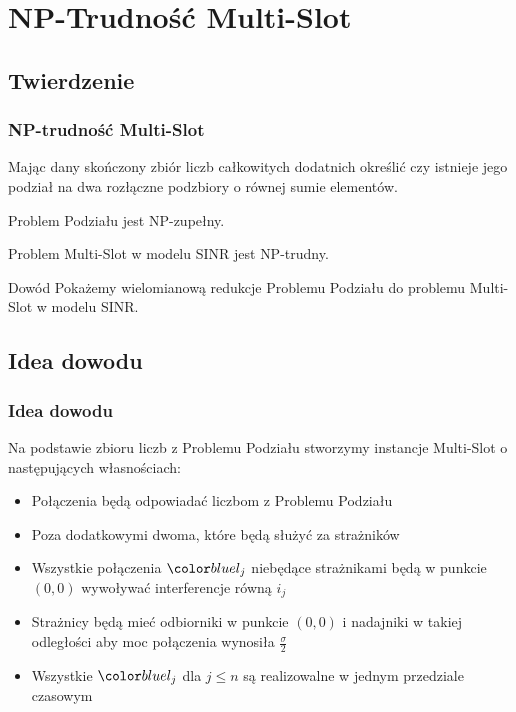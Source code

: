 \documentclass[polish, t,10pt]{beamer}
\begin{document}
\section{NP-Trudność Multi-Slot}
\subsection{Twierdzenie}
\begin{frame}
    \frametitle{NP-trudność Multi-Slot}
    \begin{definition}
        Mając dany skończony zbiór liczb całkowitych dodatnich określić czy istnieje jego podział na dwa rozłączne podzbiory o równej sumie elementów.
    \end{definition}
    \pause
    \begin{fact}
        Problem Podziału jest NP-zupełny.
    \end{fact}
    \pause
    \begin{theorem}
        Problem Multi-Slot w modelu SINR jest NP-trudny.
    \end{theorem}
    \pause
    \begin{block}{Dowód}
        Pokażemy wielomianową redukcje Problemu Podziału do problemu Multi-Slot w modelu SINR.
    \end{block}
\end{frame}
\subsection{Idea dowodu}
\begin{frame}
    \frametitle{Idea dowodu}
    Na podstawie zbioru liczb z Problemu Podziału stworzymy instancje Multi-Slot o następujących własnościach:
    \begin{itemize}
        \item Połączenia będą odpowiadać liczbom z Problemu Podziału
        \item Poza dodatkowymi dwoma, które będą służyć za strażników
        \item Wszystkie połączenia $\lj$ niebędące strażnikami będą w punkcie $(0, 0)$ wywoływać interferencje równą $i_j$
        \item Strażnicy będą mieć odbiorniki w punkcie $(0, 0)$ i nadajniki w takiej odległości aby moc połączenia wynosiła $\frac{\sigma}{2}$
        \item Wszystkie $\lj$ dla $j \leq n$ są realizowalne w jednym przedziale czasowym
    \end{itemize}
\end{frame}
\end{document}
